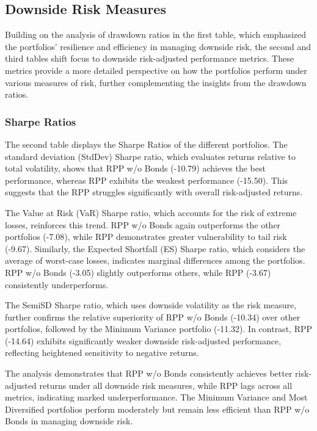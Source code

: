 \documentclass[11pt,preprint]{elsarticle}
\numberwithin{equation}{section}
\numberwithin{figure}{section}
\numberwithin{table}{section}
\begin{document}
\subsection{Downside Risk Measures}\label{downside-risk-measures}

Building on the analysis of drawdown ratios in the first table, which
emphasized the portfolios' resilience and efficiency in managing
downside risk, the second and third tables shift focus to downside
risk-adjusted performance metrics. These metrics provide a more detailed
perspective on how the portfolios perform under various measures of
risk, further complementing the insights from the drawdown ratios.

\subsubsection{Sharpe Ratios}\label{sharpe-ratios}

The second table displays the Sharpe Ratios of the different portfolios.
The standard deviation (StdDev) Sharpe ratio, which evaluates returns
relative to total volatility, shows that RPP w/o Bonds (-10.79) achieves
the best performance, whereas RPP exhibits the weakest performance
(-15.50). This suggests that the RPP struggles significantly with
overall risk-adjusted returns.

The Value at Risk (VaR) Sharpe ratio, which accounts for the risk of
extreme losses, reinforces this trend. RPP w/o Bonds again outperforms
the other portfolios (-7.08), while RPP demonstrates greater
vulnerability to tail risk (-9.67). Similarly, the Expected Shortfall
(ES) Sharpe ratio, which considers the average of worst-case losses,
indicates marginal differences among the portfolios. RPP w/o Bonds
(-3.05) slightly outperforms others, while RPP (-3.67) consistently
underperforms.

The SemiSD Sharpe ratio, which uses downside volatility as the risk
measure, further confirms the relative superiority of RPP w/o Bonds
(-10.34) over other portfolios, followed by the Minimum Variance
portfolio (-11.32). In contrast, RPP (-14.64) exhibits significantly
weaker downside risk-adjusted performance, reflecting heightened
sensitivity to negative returns.

The analysis demonstrates that RPP w/o Bonds consistently achieves
better risk-adjusted returns under all downside risk measures, while RPP
lags across all metrics, indicating marked underperformance. The Minimum
Variance and Most Diversified portfolios perform moderately but remain
less efficient than RPP w/o Bonds in managing downside risk.
\end{document}
